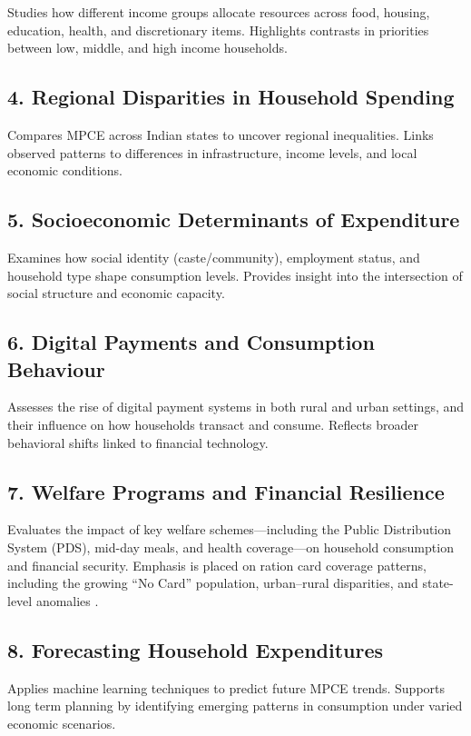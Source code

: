 \documentclass{article}
\begin{document}
Studies how different income groups allocate resources across food, housing, education, health, and discretionary items. Highlights contrasts in priorities between low, middle, and high income households.

\subsection*{4. Regional Disparities in Household Spending}

Compares MPCE across Indian states to uncover regional inequalities. Links observed patterns to differences in infrastructure, income levels, and local economic conditions.

\subsection*{5. Socioeconomic Determinants of Expenditure}

Examines how social identity (caste/community), employment status, and household type shape consumption levels. Provides insight into the intersection of social structure and economic capacity.

\subsection*{6. Digital Payments and Consumption Behaviour}

Assesses the rise of digital payment systems in both rural and urban settings, and their influence on how households transact and consume. Reflects broader behavioral shifts linked to financial technology.

\subsection*{7. Welfare Programs and Financial Resilience}
Evaluates the impact of key welfare schemes—including the Public Distribution System (PDS), mid-day meals, and health coverage—on household consumption and financial security.
Emphasis is placed on ration card coverage patterns, including the growing “No Card” population, urban–rural disparities, and state-level anomalies .

\subsection*{8. Forecasting Household Expenditures}

Applies machine learning techniques to predict future MPCE trends. Supports long term planning by identifying emerging patterns in consumption under varied economic scenarios.
\end{document}
